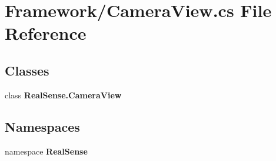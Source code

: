 \section{Framework/\+Camera\+View.cs File Reference}
\label{_camera_view_8cs}
\subsection*{Classes}
\begin{DoxyCompactItemize}
\item 
class \textbf{ Real\+Sense.\+Camera\+View}
\end{DoxyCompactItemize}
\subsection*{Namespaces}
\begin{DoxyCompactItemize}
\item 
namespace \textbf{ Real\+Sense}
\end{DoxyCompactItemize}
